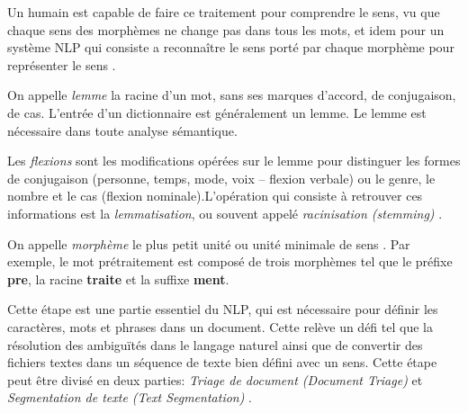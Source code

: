 Un humain est capable de faire ce traitement pour comprendre le sens, vu que chaque sens des morphèmes ne change pas dans tous les mots, et idem pour un système NLP qui consiste a reconnaître le sens porté par chaque morphème pour représenter le sens \citep{natural-language-processing}.

\begin{definition}[Lemme]
    On appelle \textit{lemme} la racine d’un mot, sans ses marques d’accord, de conjugaison, de cas. L'entrée d'un dictionnaire est généralement un lemme. Le lemme est nécessaire dans toute analyse sémantique. \citep{automatic-nlp}
\end{definition}

\begin{definition}[Flexion]
    Les \textit{flexions} sont les modifications opérées sur le lemme pour distinguer les formes de conjugaison (personne, temps, mode, voix – flexion verbale) ou le genre, le nombre et le cas (flexion nominale).L’opération qui consiste à retrouver ces informations est la \textit{lemmatisation}, ou souvent appelé \textit{racinisation (stemming)} \citep{automatic-nlp}.
\end{definition}

\begin{definition}[Morphème]
    On appelle \textit{morphème} le plus petit unité ou unité minimale de sens \citep{natural-language-processing}. Par exemple, le mot prétraitement est composé de trois morphèmes tel que le préfixe \textbf{pre}, la racine \textbf{traite} et la suffixe \textbf{ment}.
\end{definition}

Cette étape est une partie essentiel du NLP, qui est nécessaire pour définir les caractères, mots et phrases dans un document. Cette relève un défi tel que la résolution des ambiguïtés dans le langage naturel ainsi que de convertir des fichiers textes dans un séquence de texte bien défini avec un sens. Cette étape peut être divisé en deux parties: \textit{Triage de document (Document Triage)} et \textit{Segmentation de texte (Text Segmentation)} \citep{handbook-nlp}.

